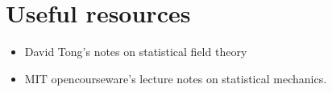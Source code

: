 \section{Useful resources}
\begin{itemize}
	\item David Tong's notes on statistical field theory 
	\item MIT opencourseware's lecture notes on statistical mechanics. 
\end{itemize}

